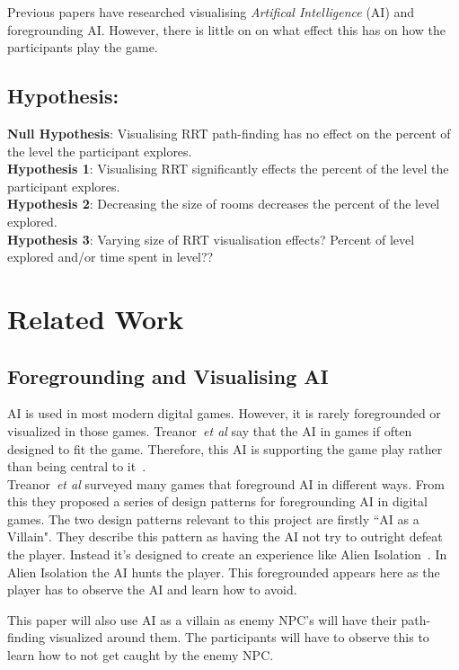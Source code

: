 \documentclass[journal]{IEEEtran}
\begin{document}
Previous papers have researched visualising \textit{Artifical Intelligence} (AI) and foregrounding AI. However, there is little on on what effect this has on how the participants play the game.


\subsection{Hypothesis:}
\textbf{Null Hypothesis}: Visualising RRT path-finding has no effect on the percent of the level the participant explores. \\
\textbf{Hypothesis 1}: Visualising RRT significantly effects the percent of the level the participant explores. \\
\textbf{Hypothesis 2}: Decreasing the size of rooms decreases the percent of the level explored. \\ 
\textbf{Hypothesis 3}: Varying size of RRT visualisation effects? 
Percent of level explored and/or time spent in level??


\section{Related Work}
\subsection{Foregrounding and Visualising AI}
AI is used in most modern digital games. However, it is rarely foregrounded or visualized in those games.  Treanor~\textit{et al} say that the AI in games if often designed to fit the game. Therefore, this AI is supporting the game play rather than being central to it~\cite{treanor2015, eladhari2011}.  \\

Treanor~\textit{et al} surveyed many games that foreground AI in different ways.  From this they proposed a series of design patterns for foregrounding AI in digital games. 
The two design patterns relevant to this project are firstly ``AI as a Villain".  They describe this pattern as having the AI not try to outright defeat the player. Instead it's designed to create an experience like Alien Isolation~\cite{game:AlienIsolation, treanor2015}.  In Alien Isolation the AI hunts the player. This foregrounded appears here as the player has to observe the AI and learn how to avoid. 

This paper will also use AI as a villain as enemy NPC's  will have their path-finding visualized around them. The participants will have to observe this to learn how to not get caught by the enemy NPC.  
\end{document}
